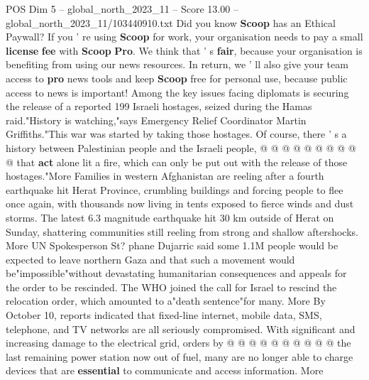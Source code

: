 \begin{textsample}{POS Dim 5 – global\_north\_2023\_11 – Score 13.00 – global\_north\_2023\_11/103440910.txt}
Did you know \textbf{Scoop} has an Ethical Paywall?
If you ' re using \textbf{Scoop} for work, your organisation needs to pay a small \textbf{license} \textbf{fee} with \textbf{Scoop} \textbf{Pro}.
We think that ' s \textbf{fair}, because your organisation is benefiting from using our news resources.
In return, we ' ll also give your team access to \textbf{pro} news tools and keep \textbf{Scoop} free for personal use, because public access to news is important!
Among the key issues facing diplomats is securing the release of a reported 199 Israeli hostages, seized during the Hamas raid."History is watching,"says Emergency Relief Coordinator Martin Griffiths."This war was started by taking those hostages.
Of course, there ' s a history between Palestinian people and the Israeli people, @ @ @ @ @ @ @ @ @ @ that \textbf{act} alone lit a fire, which can only be put out with the release of those hostages."More Families in western Afghanistan are reeling after a fourth earthquake hit Herat Province, crumbling buildings and forcing people to flee once again, with thousands now living in tents exposed to fierce winds and dust storms.
The latest 6.3 magnitude earthquake hit 30 km outside of Herat on Sunday, shattering communities still reeling from strong and shallow aftershocks.
More UN Spokesperson St? phane Dujarric said some 1.1M people would be expected to leave northern Gaza and that such a movement would be"impossible"without devastating humanitarian consequences and appeals for the order to be rescinded.
The WHO joined the call for Israel to rescind the relocation order, which amounted to a"death sentence"for many.
More By October 10, reports indicated that fixed-line internet, mobile data, SMS, telephone, and TV networks are all seriously compromised.
With significant and increasing damage to the electrical grid, orders by @ @ @ @ @ @ @ @ @ @ the last remaining power station now out of fuel, many are no longer able to charge devices that are \textbf{essential} to communicate and access information.
More

\end{textsample}
